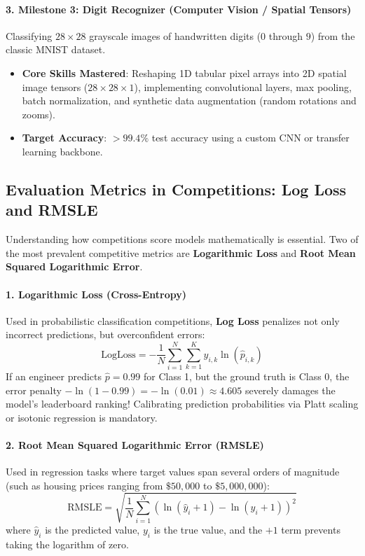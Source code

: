 \paragraph{3. Milestone 3: Digit Recognizer (Computer Vision / Spatial Tensors)}
Classifying $28 \times 28$ grayscale images of handwritten digits ($0$ through $9$) from the classic MNIST dataset.
\begin{itemize}
    \item \textbf{Core Skills Mastered}: Reshaping 1D tabular pixel arrays into 2D spatial image tensors ($28 \times 28 \times 1$), implementing convolutional layers, max pooling, batch normalization, and synthetic data augmentation (random rotations and zooms).
    \item \textbf{Target Accuracy}: $> 99.4\%$ test accuracy using a custom CNN or transfer learning backbone.
\end{itemize}

\subsection{Evaluation Metrics in Competitions: Log Loss and RMSLE}\label{subsec:competition_metrics}

Understanding how competitions score models mathematically is essential. Two of the most prevalent competitive metrics are \textbf{Logarithmic Loss} and \textbf{Root Mean Squared Logarithmic Error}.

\paragraph{1. Logarithmic Loss (Cross-Entropy)}
Used in probabilistic classification competitions, \textbf{Log Loss} penalizes not only incorrect predictions, but overconfident errors:
\begin{equation}
\text{LogLoss} = -\frac{1}{N} \sum_{i=1}^{N} \sum_{k=1}^{K} y_{i,k} \ln(\hat{p}_{i,k})\label{eq:log_loss}
\end{equation}
If an engineer predicts $\hat{p} = 0.99$ for Class 1, but the ground truth is Class 0, the error penalty $-\ln(1 - 0.99) = -\ln(0.01) \approx 4.605$ severely damages the model's leaderboard ranking! Calibrating prediction probabilities via Platt scaling or isotonic regression is mandatory.

\paragraph{2. Root Mean Squared Logarithmic Error (RMSLE)}
Used in regression tasks where target values span several orders of magnitude (such as housing prices ranging from $\$50{,}000$ to $\$5{,}000{,}000$):
\begin{equation}
\text{RMSLE} = \sqrt{\frac{1}{N} \sum_{i=1}^{N} \left( \ln(\hat{y}_i + 1) - \ln(y_i + 1) \right)^2}\label{eq:rmsle}
\end{equation}
where $\hat{y}_i$ is the predicted value, $y_i$ is the true value, and the $+1$ term prevents taking the logarithm of zero.

